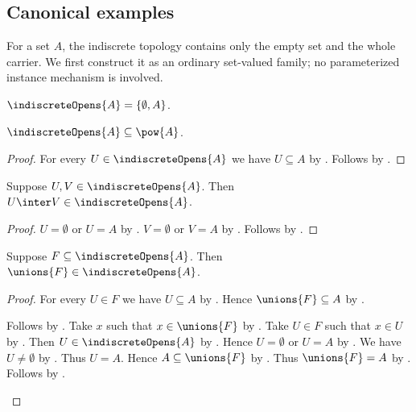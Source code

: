 \subsection{Canonical examples}

For a set $A$, the indiscrete topology contains only the empty set and the
whole carrier.  We first construct it as an ordinary set-valued family; no
parameterized instance mechanism is involved.

\begin{definition}\label{indiscrete_opens}
    $\indiscreteOpens{A}=\{\emptyset,A\}$.
\end{definition}

\begin{proposition}\label{indiscrete_opens_type}
    $\indiscreteOpens{A}\subseteq\pow{A}$.
\end{proposition}
\begin{proof}
    For every $U\in\indiscreteOpens{A}$ we have $U\subseteq A$
        by .
    Follows by .
\end{proof}

\begin{proposition}\label{indiscrete_opens_intersection}
    Suppose $U,V\in\indiscreteOpens{A}$.
    Then $U\inter V\in\indiscreteOpens{A}$.
\end{proposition}
\begin{proof}
    $U=\emptyset$ or $U=A$
        by .
    $V=\emptyset$ or $V=A$
        by .
    Follows by
        .
\end{proof}

\begin{proposition}\label{indiscrete_opens_unions}
    Suppose $F\subseteq\indiscreteOpens{A}$.
    Then $\unions{F}\in\indiscreteOpens{A}$.
\end{proposition}
\begin{proof}
    For every $U\in F$ we have $U\subseteq A$
        by .
    Hence $\unions{F}\subseteq A$ by .
    \begin{byCase}
        Follows by .
        Take $x$ such that $x\in\unions{F}$ by .
        Take $U\in F$ such that $x\in U$ by .
        Then $U\in\indiscreteOpens{A}$ by .
        Hence $U=\emptyset$ or $U=A$
            by .
        We have $U\neq\emptyset$ by .
        Thus $U=A$.
        Hence $A\subseteq\unions{F}$ by .
        Thus $\unions{F}=A$ by .
        Follows by .
    \end{byCase}
\end{proof}

